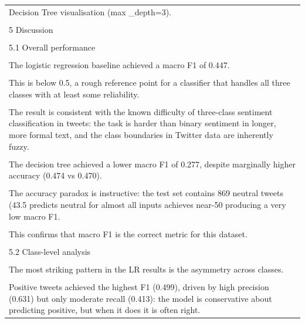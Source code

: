 \documentclass[11pt]{article}
\begin{document}
\begin{longtable}{|p{\dimexpr\linewidth-2\tabcolsep-2\arrayrulewidth\relax}|}
\hline
\rule{0pt}{3.5cm} \\
\hline
Decision Tree visualisation (max \_depth=3). \\[2pt]
\hline
\rule{0pt}{3.5cm} \\
\hline
5 Discussion \\[2pt]
\hline
\rule{0pt}{3.5cm} \\
\hline
5.1 Overall performance \\[2pt]
\hline
\rule{0pt}{3.5cm} \\
\hline
The logistic regression baseline achieved a macro F1 of 0.447. \\[2pt]
\hline
\rule{0pt}{3.5cm} \\
\hline
This is below 0.5, a rough reference point for a classifier that handles all three classes with at least some reliability. \\[2pt]
\hline
\rule{0pt}{3.5cm} \\
\hline
The result is consistent with the known difficulty of three-class sentiment classification in tweets: the task is harder than binary sentiment in longer, more formal text, and the class boundaries in Twitter data are inherently fuzzy. \\[2pt]
\hline
\rule{0pt}{3.5cm} \\
\hline
The decision tree achieved a lower macro F1 of 0.277, despite marginally higher accuracy (0.474 vs 0.470). \\[2pt]
\hline
\rule{0pt}{3.5cm} \\
\hline
The accuracy paradox is instructive: the test set contains 869 neutral tweets (43.5 predicts neutral for almost all inputs achieves near-50 producing a very low macro F1. \\[2pt]
\hline
\rule{0pt}{3.5cm} \\
\hline
This confirms that macro F1 is the correct metric for this dataset. \\[2pt]
\hline
\rule{0pt}{3.5cm} \\
\hline
5.2 Class-level analysis \\[2pt]
\hline
\rule{0pt}{3.5cm} \\
\hline
The most striking pattern in the LR results is the asymmetry across classes. \\[2pt]
\hline
\rule{0pt}{3.5cm} \\
\hline
Positive tweets achieved the highest F1 (0.499), driven by high precision (0.631) but only moderate recall (0.413): the model is conservative about predicting positive, but when it does it is often right. \\[2pt]

\end{longtable}
\end{document}
